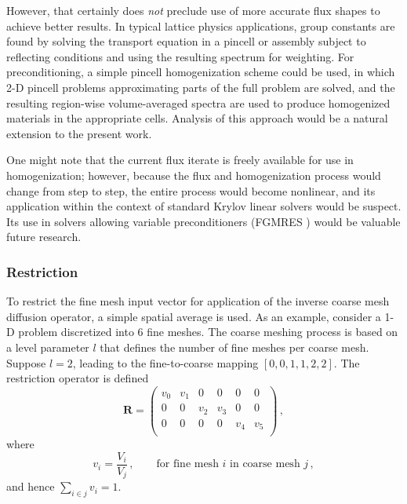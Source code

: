 However, that certainly does \emph{ not} preclude use of more accurate 
flux shapes to achieve better results. 
In typical lattice physics applications, group constants are 
found by solving the transport equation in a pincell or assembly subject 
to reflecting conditions and using the resulting spectrum for weighting.  
For preconditioning, a simple pincell homogenization scheme could be used, 
in which 2-D pincell problems approximating parts of the full problem 
are solved, and the resulting region-wise volume-averaged spectra are used to 
produce homogenized materials in the appropriate cells.  Analysis of this 
approach would be a natural extension to the present work.

One might note that the current flux iterate is 
freely available for use in homogenization; however, because the flux 
and homogenization process would change from step to step, the entire 
process would become nonlinear, and its application within the context 
of standard Krylov linear solvers would be suspect.  Its use 
in solvers allowing variable preconditioners (\eg FGMRES \cite{saad1993fio})
would be valuable future research.

\subsubsection{Restriction}

To restrict the fine mesh input vector for application of the inverse coarse 
mesh diffusion operator, a simple spatial average is used.  As an example, 
consider a 1-D problem discretized into 6 fine meshes.  The coarse 
meshing process is based on a level parameter $l$ that defines the 
number of fine meshes per coarse mesh.  Suppose $l=2$, leading to 
the fine-to-coarse mapping $[0,0,1,1,2,2]$.  The restriction operator
is defined 
\begin{equation}
  \bm{R} = 
           \left(
           \begin{array}{cccccc}
              v_0 & v_1 &  0  &  0  &  0  &  0  \\
                0  &  0 & v_2 & v_3 &  0  &  0  \\
                0  &  0 &  0  &  0  & v_4 & v_5  \\
           \end{array} 
           \right ) \, ,
\end{equation}
where
\begin{equation}
 v_i = \frac{V_i}{V_j} \, , \quad \quad
   \text{for fine mesh $i$ in coarse mesh $j$} \, ,
\end{equation}
and hence $\sum_{i\in j} v_i = 1$.

